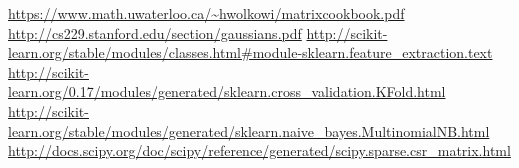 \documentclass[fleqn]{article}
\begin{document}
\begin{thebibliography}{99}
        \bibitem{[1]} \url{https://www.math.uwaterloo.ca/~hwolkowi/matrixcookbook.pdf}
        \bibitem{[2]} \url{http://cs229.stanford.edu/section/gaussians.pdf}
        \bibitem{[3]} \url{http://scikit-learn.org/stable/modules/classes.html#module-sklearn.feature\_extraction.text}
        \bibitem{[4]} \url{http://scikit-learn.org/0.17/modules/generated/sklearn.cross\_validation.KFold.html}
        \bibitem{[5]} \url{http://scikit-learn.org/stable/modules/generated/sklearn.naive\_bayes.MultinomialNB.html}
        \bibitem{[6]} \url{http://docs.scipy.org/doc/scipy/reference/generated/scipy.sparse.csr\_matrix.html}
\end{thebibliography}
\end{document}
